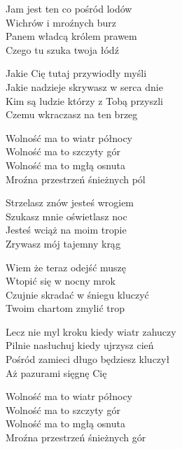 \begin{text}
    Jam jest ten co pośród lodów\\
    Wichrów i mroźnych burz\\
    Panem władcą królem prawem\\
    Czego tu szuka twoja łódź

    \vin Jakie Cię tutaj przywiodły myśli\\
    \vin Jakie nadzieje skrywasz w serca dnie\\
    \vin Kim są ludzie którzy z Tobą przyszli\\
    \vin Czemu wkraczasz na ten brzeg

    \vin Wolność ma to wiatr północy\\
    \vin Wolność ma to szczyty gór\\
    \vin Wolność ma to mgłą osnuta\\
    \vin Mroźna przestrzeń śnieżnych pól

    Strzelasz znów jesteś wrogiem\\
    Szukasz mnie oświetlasz noc\\
    Jesteś wciąż na moim tropie\\
    Zrywasz mój tajemny krąg

    Wiem że teraz odejść muszę\\
    Wtopić się w nocny mrok\\
    Czujnie skradać w śniegu kluczyć\\
    Twoim chartom zmylić trop

    \vin Lecz nie myl kroku kiedy wiatr zahuczy\\
    \vin Pilnie nasłuchuj kiedy ujrzysz cień\\
    \vin Pośród zamieci długo będziesz kluczył\\
    \vin Aż pazurami sięgnę Cię

    \vin Wolność ma to wiatr północy\\
    \vin Wolność ma to szczyty gór\\
    \vin Wolność ma to mgłą osnuta\\
    \vin Mroźna przestrzeń śnieżnych gór
\end{text}
\begin{chord}

\end{chord}